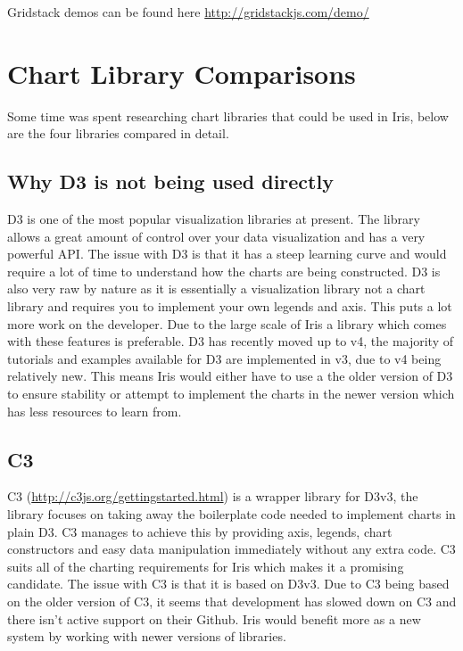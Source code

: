 \documentclass[12pt,a4paper,titlepage]{report}
\begin{document}
\begin{appendices}
Gridstack demos can be found here \url{http://gridstackjs.com/demo/}



\chapter{Chart Library Comparisons}

Some time was spent researching chart libraries that could be used in Iris, below are the four libraries compared in detail.

\section{Why D3 is not being used directly}

D3 is one of the most popular visualization libraries at present. The library allows a great amount of control over your data visualization and has a very powerful API. The issue with D3 is that it has a steep learning curve and would require a lot of time to understand how the charts are being constructed. D3 is also very raw by nature as it is essentially a visualization library not a chart library and requires you to implement your own legends and axis. This puts a lot more work on the developer. Due to the large scale of Iris a library which comes with these features is preferable. D3 has recently moved up to v4, the majority of tutorials and examples available for D3 are implemented in v3, due to v4 being relatively new. This means Iris would either have to use a the older version of D3 to ensure stability or attempt to implement the charts in the newer version which has less resources to learn from.

\section{C3}

C3 (\url{http://c3js.org/gettingstarted.html}) is a wrapper library for D3v3, the library focuses on taking away the boilerplate code needed to implement charts in plain D3. C3 manages to achieve this by providing axis, legends, chart constructors and easy data manipulation immediately without any extra code. C3 suits all of the charting requirements for Iris which makes it a promising candidate. The issue with C3 is that it is based on D3v3. Due to C3 being based on the older version of C3, it seems that development has slowed down on C3 and there isn’t active support on their Github. Iris would benefit more as a new system by working with newer versions of libraries.


\end{appendices}
\end{document}
